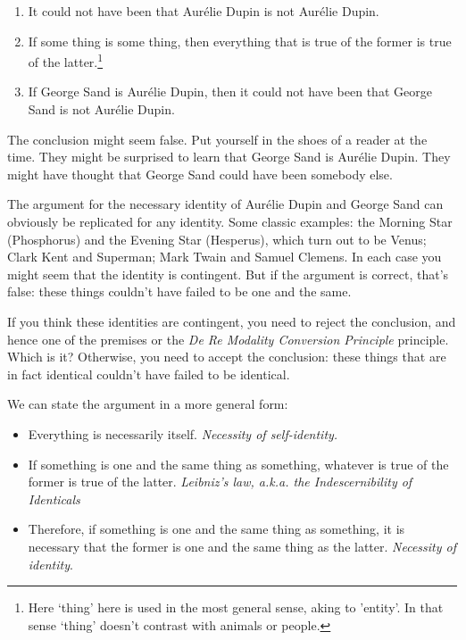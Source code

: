 \documentclass[../../../include/open-logic-chapter]{subfiles}
\begin{document}
\begin{enumerate}
\item It could not have been that Aurélie Dupin is not Aurélie Dupin.
\item If some thing is some thing, then everything that is true of the
former is true of the latter.\footnote{Here `thing' here is used in
the most general sense, aking to 'entity'. In that sense `thing'
doesn't contrast with animals or people.}
\item If George Sand is Aurélie Dupin, then it could not have been that
George Sand is not Aurélie Dupin. 
\end{enumerate}

The conclusion might seem false. Put yourself in the shoes of a reader
at the time. They might be surprised to learn that George Sand is 
Aurélie Dupin. They might have thought that George Sand could have 
been somebody else. 

The argument for the necessary identity of Aurélie Dupin and George 
Sand can obviously be replicated for any identity. Some classic examples: the Morning Star (Phosphorus) and the Evening Star (Hesperus), which turn
out to be Venus; Clark Kent and Superman; Mark Twain and Samuel Clemens. 
In each case you might seem that the identity is contingent. But if 
the argument is correct, that's false: these things couldn't have 
failed to be one and the same.

If you think these identities are contingent, you need to reject the
conclusion, and hence one of the premises or the \emph{De Re Modality
Conversion Principle} principle. Which is it? Otherwise, you need to
accept the conclusion: these things that are in fact identical
couldn't have failed to be identical. 

We can state the argument in a more general form:

\begin{itemize}
\item Everything is necessarily itself. \emph{Necessity of self-identity.} 
\item If something is one and the same thing as something, whatever is true of the former is true of the latter. \emph{Leibniz's law, a.k.a. the Indescernibility of Identicals}
\item Therefore, if something is one and the same thing as something, it is necessary that the former is one and the same thing as the latter. \emph{Necessity of identity}. 
\end{itemize}
\end{document}
